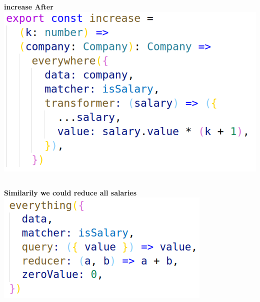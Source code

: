 \documentclass[14pt]{beamer}
\begin{document}
\begin{frame}
\begin{columns}
\begin{column}{.5\textwidth}
      \centering\textbf{increase After}
      \includegraphics[height=0.7\textheight,width=\textwidth,keepaspectratio]{graphics/increase-ts.png}
    \end{column}
  \end{columns}
\end{frame}

\begin{frame}
  \centering\textbf{Similarily we could reduce all salaries}
  \vfill
  \includegraphics[height=0.8\textheight,width=\textwidth,keepaspectratio]{graphics/bill-slim-ts.png}
\end{frame}
\end{document}
